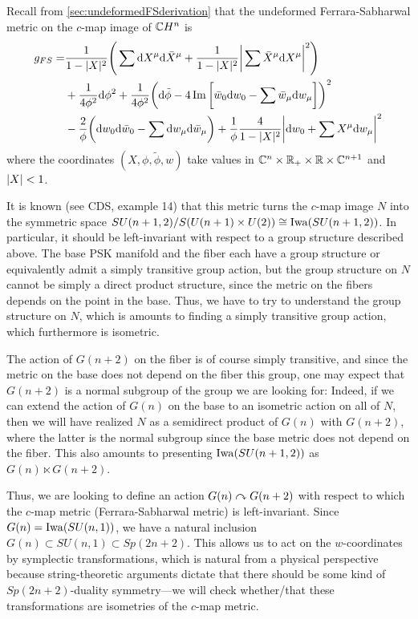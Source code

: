 Recall from \cref{sec:undeformedFSderivation} that the undeformed Ferrara-Sabharwal metric on the $c$-map image of $\mathbb{C} H^n$ is 
\begin{align*}
	g_{FS}=&\frac{1}{1-\lvert X \rvert^2}\Bigg(\sum \mathrm{d} X^\mu \mathrm{d} \bar X^\mu 
	+ \frac{1}{1-\lvert X \rvert^2}\bigg|\sum \bar X^\mu \mathrm{d} X^\mu \bigg|^2\Bigg)\\
	&+\frac{1}{4\phi^2}\mathrm{d} \phi^2 
	+\frac{1}{4\phi^2}\bigg(\mathrm{d}\tilde\phi-4\operatorname{Im}\bigg[\bar w_0\mathrm{d} w_0 - \sum \bar w_\mu \mathrm{d} w_\mu\bigg]\bigg)^2\\
	&-\frac{2}{\phi} \bigg( \mathrm{d} w_0 \mathrm{d} \bar w_0 - \sum \mathrm{d} w_\mu \mathrm{d} \bar w_\mu \bigg)
	+\frac{1}{\phi}\frac{4}{1-\lvert X \rvert^2}\bigg|\mathrm{d} w_0 + \sum X^\mu \mathrm{d} w_\mu \bigg|^2
\end{align*}
where the coordinates $(X,\phi,\tilde\phi,w)$ take values in $\mathbb{C}^n\times \mathbb{R}_+\times \mathbb{R}\times \mathbb{C}^{n+1}$ and $\lvert X \rvert<1$.

It is known (see CDS, example 14) that this metric turns the $c$-map image $N$ into the symmetric space $SU(n+1,2)/S(U(n+1)\times U(2))\cong\operatorname{Iwa}(SU(n+1,2))$. In particular, it should be left-invariant with respect to a group structure described above. The base PSK manifold and the fiber each have a group structure or equivalently admit a simply transitive group action, but the group structure on $N$ cannot be simply a direct product structure, since the metric on the fibers depends on the point in the base. Thus, we have to try to understand the group structure on $N$, which is amounts to finding a simply transitive group action, which furthermore is isometric. 

The action of $G(n+2)$ on the fiber is of course simply transitive, and since the metric on the base does not depend on the fiber this group, one may expect that $G(n+2)$ is a normal subgroup of the group we are looking for: Indeed, if we can extend the action of $G(n)$ on the base to an isometric action on all of $N$, then we will have realized $N$ as a semidirect product of $G(n)$ with $G(n+2)$, where the latter is the normal subgroup since the base metric does not depend on the fiber. This also amounts to presenting $\operatorname{Iwa}(SU(n+1,2))$ as $G(n)\ltimes G(n+2)$.

Thus, we are looking to define an action $G(n)\curvearrowright G(n+2)$ with respect to which the $c$-map metric (Ferrara-Sabharwal metric) is left-invariant. Since $G(n)=\operatorname{Iwa}(SU(n,1))$, we have a natural inclusion $G(n)\subset SU(n,1)\subset Sp(2n+2)$. This allows us to act on the $w$-coordinates by symplectic transformations, which is natural from a physical perspective because string-theoretic arguments dictate that there should be some kind of $Sp(2n+2)$-duality symmetry---we will check whether/that these transformations are isometries of the $c$-map metric.

